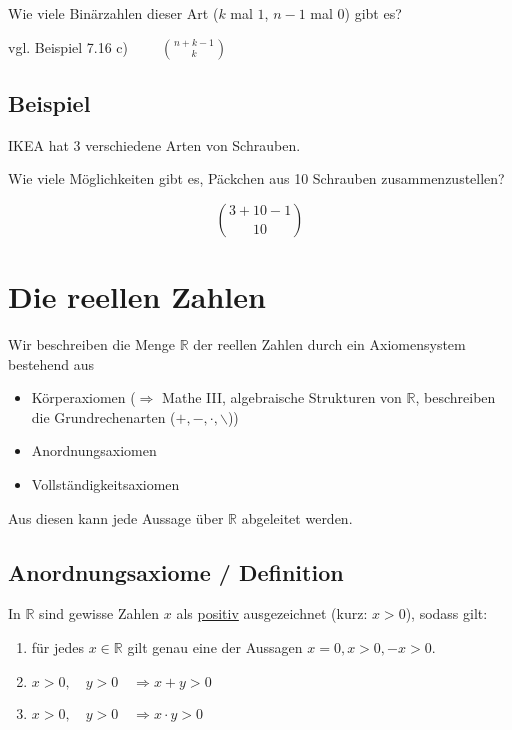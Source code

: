 \documentclass[a4paper, 12pt, twoside] {article}
\begin{document}
Wie viele Binärzahlen dieser Art ($k$ mal $1$, $n-1$ mal $0$) gibt es?

vgl. Beispiel 7.16 c) $\qquad \binom{n+k-1}{k}$

\subsection[Beispiel (IKEA)]{Beispiel} %

IKEA hat 3 verschiedene Arten von Schrauben.

Wie viele Möglichkeiten gibt es, Päckchen aus 10 Schrauben zusammenzustellen?


$$\binom{3+10-1}{10}$$


\section{Die reellen Zahlen} %

Wir beschreiben die Menge $\mathbb{R}$ der reellen Zahlen durch ein Axiomensystem bestehend aus

\begin{itemize}

\item Körperaxiomen ($\Rightarrow$ Mathe III, algebraische Strukturen von $\mathbb{R}$, beschreiben die Grundrechenarten ($+, -, \cdot, \backslash$))

\item Anordnungsaxiomen

\item Vollständigkeitsaxiomen

\end{itemize}

Aus diesen kann jede Aussage über $\mathbb{R}$ abgeleitet werden.

\subsection{Anordnungsaxiome / Definition} %

In $\mathbb{R}$ sind gewisse Zahlen $x$ als \underline{positiv} ausgezeichnet (kurz: $x > 0$), sodass gilt:

\begin{enumerate}

\item für jedes $x \in \mathbb{R}$ gilt genau eine der Aussagen $x = 0, x > 0, -x > 0$.

\item $x > 0, \quad y > 0 \quad \Rightarrow x + y > 0$

\item $x > 0, \quad y > 0 \quad \Rightarrow x \cdot y > 0$

\end{enumerate}
\end{document}
